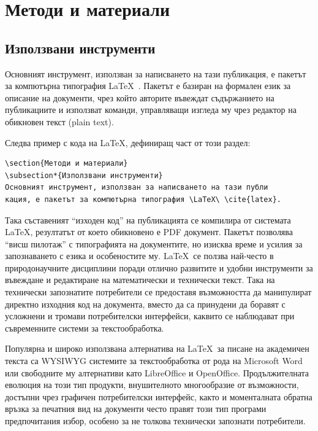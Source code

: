 \documentclass[11pt, oneside]{article}     %
\begin{document}
\section{Методи и материали}
\subsection*{Използвани инструменти}
Основният инструмент, използван за написването на тази публикация, е пакетът за компютърна типография \LaTeX\ \cite{latex}. Пакетът е базиран на формален език за описание на документи, чрез който авторите въвеждат съдържанието на публикациите и използват команди, управляващи изгледа му чрез редактор на обикновен текст (plain text).

Следва пример с кода на \LaTeX, дефиниращ част от този раздел:
\begin{Verbatim}[frame=single]
\section{Методи и материали}
\subsection*{Използвани инструменти}
Основният инструмент, използван за написването на тази публи
кация, е пакетът за компютърна типография \LaTeX\ \cite{latex}.
\end{Verbatim}

Така съставеният ``изходен код'' на публикацията се компилира от системата \LaTeX, резултатът от което обикновено е PDF документ. Пакетът позволява ``висш пилотаж'' с типографията на документите, но изисква време и усилия за запознаването с езика и особеностите му. \LaTeX\ се ползва най-често в природонаучните дисциплини поради отлично развитите и удобни инструменти за въвеждане и редактиране на математически и технически текст. Така на технически запознатите потребители се предоставя възможността да манипулират директно изходния код на документа, вместо да са принудени да боравят с усложнени и тромави потребителски интерфейси, каквито се наблюдават при съвременните системи за текстообработка.

Популярна и широко използвана алтернатива на \LaTeX\ за писане на академичен текста са WYSIWYG системите за текстообработка от рода на Microsoft Word или свободните му алтернативи като LibreOffice и Open\-Office. Продължителната еволюция на този тип продукти, внушителното многообразие от възможности, достъпни чрез графичен потребителски интерфейс, както и моменталната обратна връзка за печатния вид на документи често правят този тип програми предпочитания избор, особено за не толкова технически запознати потребители.
\end{document}
